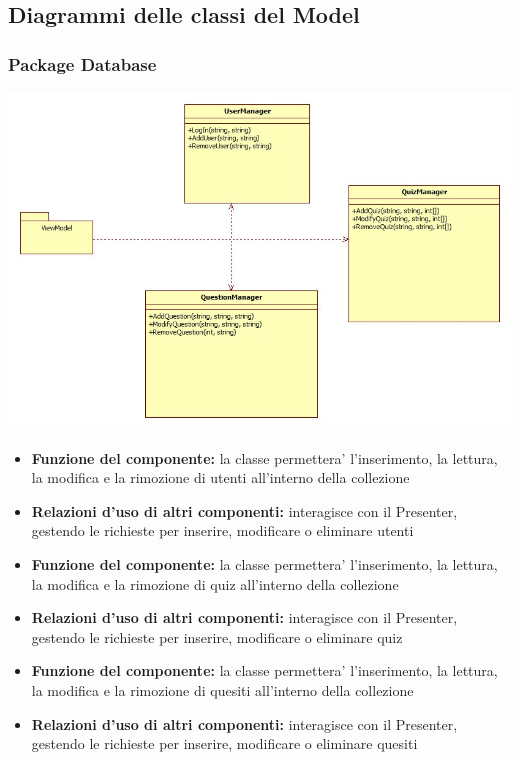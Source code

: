 \subsection{Diagrammi delle classi del Model}
			\subsubsection{Package Database}
			\begin{center}
				\includegraphics[scale=0.6]{../images/Database.jpg}
			\end{center}
 			\begin{itemize}
		    	\item\textbf{Funzione del componente:} la classe permettera' l'inserimento, la lettura, la modifica e la rimozione di utenti all'interno della collezione
			\item\textbf{Relazioni d'uso di altri componenti:} interagisce con il Presenter, gestendo le richieste per inserire, modificare o eliminare utenti

			\end{itemize}
			\begin{itemize}
		    	\item\textbf{Funzione del componente:} la classe permettera' l'inserimento, la lettura, la modifica e la rimozione di quiz all'interno della collezione
			\item\textbf{Relazioni d'uso di altri componenti:} interagisce con il Presenter, gestendo le richieste per inserire, modificare o eliminare quiz
			\end{itemize}
			\begin{itemize}
		    	\item\textbf{Funzione del componente:} la classe permettera' l'inserimento, la lettura, la modifica e la rimozione di quesiti all'interno della collezione
			\item\textbf{Relazioni d'uso di altri componenti:} interagisce con il Presenter, gestendo le richieste per inserire, modificare o eliminare quesiti
			\end{itemize}
			
